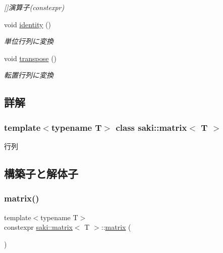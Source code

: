 \begin{DoxyCompactItemize}
\begin{DoxyCompactList}\small\item\em \mbox{[}\mbox{]}演算子(constexpr) \end{DoxyCompactList}\item 
void \mbox{\hyperlink{classsaki_1_1matrix_a9f7f8909ee94f44e91faca871f57b936}{identity}} ()
\begin{DoxyCompactList}\small\item\em 単位行列に変換 \end{DoxyCompactList}\item 
void \mbox{\hyperlink{classsaki_1_1matrix_a95e01e24e45757c1e45b5af25273a8fa}{transpose}} ()
\begin{DoxyCompactList}\small\item\em 転置行列に変換 \end{DoxyCompactList}\end{DoxyCompactItemize}


\subsection{詳解}
\subsubsection*{template$<$typename T$>$\newline
class saki\+::matrix$<$ T $>$}

行列 

\subsection{構築子と解体子}
\mbox{\label{classsaki_1_1matrix_aca5102e0cdaedc779d668597d03baf10}} 
\subsubsection{\texorpdfstring{matrix()}{matrix()}\hspace{0.1cm}{\footnotesize\ttfamily [1/6]}}
{\footnotesize\ttfamily template$<$typename T$>$ \\
constexpr \mbox{\hyperlink{classsaki_1_1matrix}{saki\+::matrix}}$<$ T $>$\+::\mbox{\hyperlink{classsaki_1_1matrix}{matrix}} (\begin{DoxyParamCaption}{ }\end{DoxyParamCaption})\hspace{0.3cm}{\ttfamily [inline]}}



